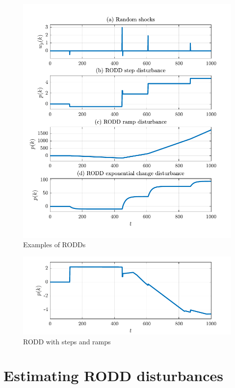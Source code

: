 \begin{figure}[htp]
	\centering
	\includegraphics[width=13.5cm]{images/rodd_sim_plots.pdf}
	\caption{Examples of RODDs}
	\label{fig:rodd-sim-plots}
\end{figure}

\begin{figure}[htp]
	\centering
	\includegraphics[width=13.5cm]{images/rodd_sim_plot2.pdf}
	\caption{RODD with steps and ramps}
	\label{fig:rodd-sim-plot2}
\end{figure}


\section{Estimating RODD disturbances} \label{section:sim-obs-lin}

